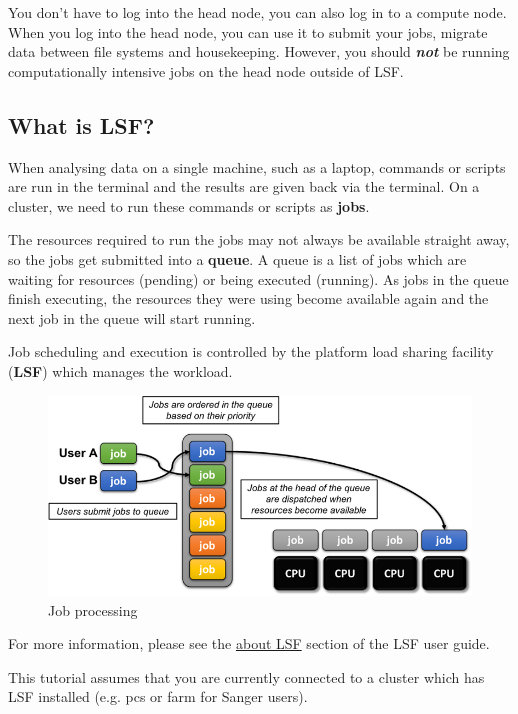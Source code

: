 \documentclass[11pt]{article}
\makeatletter
\def\maxwidth{\ifdim\Gin@nat@width>\linewidth\linewidth
    \else\Gin@nat@width\fi}
\let\Oldincludegraphics\includegraphics
\renewcommand{\includegraphics}[1]{\Oldincludegraphics[width=.8\maxwidth, height=.55\textheight, keepaspectratio]{#1}}
\makeatother
\begin{document}
    You don't have to log into the head node, you can also log in to a
compute node. When you log into the head node, you can use it to submit
your jobs, migrate data between file systems and housekeeping. However,
you should \textit{\textbf{not}} be running computationally intensive jobs
on the head node outside of LSF.

    \subsection{What is LSF?}\label{what-is-lsf}

When analysing data on a single machine, such as a laptop, commands or
scripts are run in the terminal and the results are given back via the
terminal. On a cluster, we need to run these commands or scripts as
\textbf{jobs}.

The resources required to run the jobs may not always be available
straight away, so the jobs get submitted into a \textbf{queue}. A queue
is a list of jobs which are waiting for resources (pending) or being
executed (running). As jobs in the queue finish executing, the resources
they were using become available again and the next job in the queue
will start running.

Job scheduling and execution is controlled by the platform load sharing
facility (\textbf{LSF}) which manages the workload.

    \begin{figure}[!h]
\centering
\includegraphics{images/job_processing.png}
\caption{Job processing}
\end{figure}

    For more information, please see the
\href{https://www.ibm.com/support/knowledgecenter/SSETD4_9.1.3/lsf_users_guide/chap_lsf_about.html}{about
LSF} section of the LSF user guide.

    This tutorial assumes that you are currently connected to a cluster
which has LSF installed (e.g. pcs or farm for Sanger users).
\end{document}
